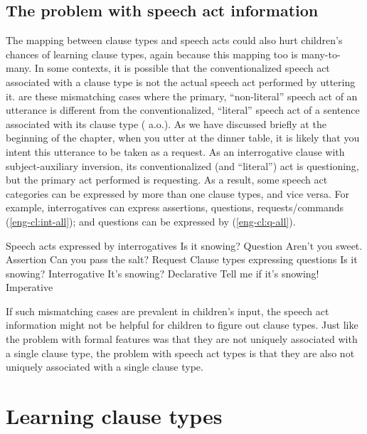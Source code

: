 \subsection{The problem with speech act information}
The mapping between clause types and speech acts could also hurt children's chances of learning clause types, again because this mapping too is many-to-many. In some contexts, it is possible that the conventionalized speech act associated with a clause type is not the actual speech act performed by uttering it.  are these mismatching cases where the primary, ``non-literal'' speech act of an utterance is different from the conventionalized, ``literal'' speech act of a sentence associated with its clause type (\citealt{searle1975tax, searle1976class, bachharnish1979, searlevanderveken1985, portner2004, starr2014, portner2018, murraystarr2020} a.o.). As we have discussed briefly at the beginning of the chapter,  when you utter  at the dinner table, it is likely that you intent this utterance to be taken as a request. As an interrogative clause with subject-auxiliary inversion, its conventionalized (and ``literal'') act is questioning, but the primary act performed is requesting. As a result, some speech act categories can be expressed by more than one clause types, and vice versa. For example, interrogatives can express assertions, questions, requests/commands (\ref{eng-cl:int-all}); and questions can be expressed by \diis{} (\ref{eng-cl:q-all}).

Speech acts expressed by interrogatives 
\bxl Is it snowing? \hfill Question
\ex Aren't you sweet. \hfill Assertion
\ex Can you pass the salt? \hfill Request
\exl
\eex
{}
Clause types expressing questions
\bxl
Is it snowing? \hfill Interrogative
\ex It's snowing? \hfill Declarative
\ex Tell me if it's snowing! \hfill Imperative
\exl
\eex

If such mismatching cases are prevalent in children's input, the speech act information might not be helpful for children to figure out clause types. Just like the problem with formal features was that they are not uniquely associated with a single clause type, the problem with speech act types is that they are also not uniquely associated with a single clause type.


\section{Learning clause types}
\label{sec:intro:hypo}

